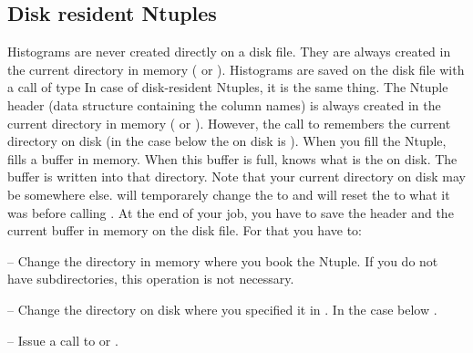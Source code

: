 
\subsection*{Disk resident Ntuples}

Histograms are never created directly on a disk file.
They are always created in the current directory in memory
( or ).
Histograms are saved on the disk file with a call of type
In case of disk-resident Ntuples, it is the same thing.
The Ntuple header
(data structure containing the column names) is always created
in the current directory in memory
( or ).
However, the call to  remembers the current
directory on disk (in the case below
the  on disk is ).
When you fill the Ntuple,  fills a buffer in memory.
When this buffer is full,  knows what is the  on disk.
The buffer is written into that directory.
Note that your current directory on disk may be somewhere else.
 will temporarely change the  to 
and will reset the  to what it was before calling .
At the end of your job, you have to save the header and the current buffer
in memory on the disk file.
For that you have to:

\begin{UL}
\item[--] Change the directory in memory where you book the Ntuple.
          If you do not have subdirectories,
          this operation is not necessary.
\item[--] Change the directory on disk where you specified it in
          .
          In the case below .
\item[--] Issue a call to  or .
\end{UL}


